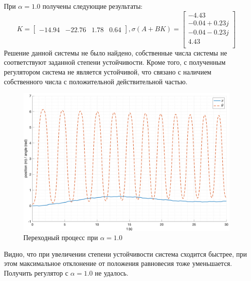\FloatBarrier
При $\alpha = 1.0$ получены следующие результаты: 
\begin{equation}
    K = \begin{bmatrix} -14.94  & -22.76  & 1.78  & 0.64  \end{bmatrix}, \sigma(A + BK) = \begin{bmatrix} -4.43 \\ -0.04 + 0.23j \\ -0.04 - 0.23j \\ 4.43 \\ \end{bmatrix}
\end{equation}
Решение данной системы не было найдено, собственные числа системы не соответствуют заданной степени устойчивости.
Кроме того, с полученным регулятором система не является устойчивой, что связано с наличием 
собственного числа с положительной действительной частью.

\begin{figure}[ht!]
    \centering
    \includegraphics[width=\textwidth]{media/plots/nonmodal_controlers_min/out_6.png}
    \caption{Переходный процесс при $\alpha = 1.0$}
    \label{fig:nonmodal_control_alpha_2_3}
\end{figure} 
\FloatBarrier 

Видно, что при увеличении степени устойчивости система сходится быстрее, при этом 
максимальное отклонение от положения равновесия тоже уменьшается. 
Получить регулятор с $\alpha = 1.0$ не удалось. 

